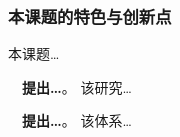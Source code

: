 \justifying
\NSFCBodyText

\subsubsection{本课题的特色与创新点}

本课题\dots

~~\textbf{提出\dots}。
该研究\dots

~~\textbf{提出\dots}。
该体系\dots